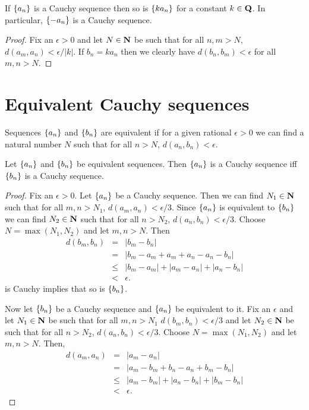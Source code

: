 \begin{lem}\label{c4s1l5}
If $\{a_n\}$ is a Cauchy sequence then so is $\{ka_n\}$ for a constant
$k \in \mathbf{Q}$. In particular, $\{-a_n\}$ is a Cauchy sequence.
\end{lem}
\begin{proof}
Fix an $\epsilon > 0$ and let $N \in \mathbf{N}$ be such that for all $n, m > N$,
$d(a_m, a_n) < \epsilon/|k|$. If $b_n = ka_n$ then we clearly have $d(b_n,
b_m) < \epsilon$ for all $m, n > N$.
\end{proof}

\section{Equivalent Cauchy sequences}\label{c4s2}
\begin{defn}\label{c4s2d1}
Sequences $\{a_n\}$ and $\{b_n\}$ are equivalent if for a given
rational $\epsilon > 0$ we can find a natural number $N$ such that for
all $n > N$, $d(a_n, b_n) < \epsilon$.
\end{defn}

\begin{lem}\label{c4s2l2}
Let $\{a_n\}$ and $\{b_n\}$ be equivalent sequences. Then $\{a_n\}$ 
is a Cauchy sequence iff $\{b_n\}$ is a Cauchy sequence.
\end{lem}
\begin{proof}
Fix an $\epsilon > 0$. Let $\{a_n\}$ be a Cauchy sequence. Then we can
find $N_1 \in \mathbf{N}$ such that for all $m, n > N_1$, $d(a_m, a_n) < 
\epsilon/3$. Since $\{a_n\}$ is equivalent to $\{b_n\}$ we can find $N_2
\in \mathbf{N}$ such that for all $n > N_2$, $d(a_n, b_n) < \epsilon/3$. Choose
$N = \max(N_1, N_2)$ and let $m, n > N$. Then
\begin{eqnarray*}
d(b_m, b_n) &=& |b_m - b_n| \\
 &=& |b_m - a_m + a_m + a_n - a_n - b_n| \\
 &\le& |b_m - a_m| + |a_m - a_n| + |a_n - b_n| \\
 &<& \epsilon.
\end{eqnarray*}
is Cauchy implies that so is $\{b_n\}$.

Now let $\{b_n\}$ be a Cauchy sequence and $\{a_n\}$ be equivalent to 
it.  Fix an $\epsilon$ and let $N_1 \in \mathbf{N}$ be such that for all $m, n > 
N_1$ $d(b_m, b_n) < \epsilon/3$ and let $N_2 \in \mathbf{N}$ be such that for 
all $n > N_2$, $d(a_n, b_n) < \epsilon/3$. Choose $N = \max(N_1, N_2)$ 
and let $m, n > N$. Then,
\begin{eqnarray*}
d(a_m, a_n) &=& |a_m - a_n| \\
 &=& |a_m - b_m + b_n - a_n + b_m - b_n| \\
 &\le& |a_m - b_m| + |a_n - b_n| + |b_m - b_n| \\
 &<& \epsilon.
\end{eqnarray*}
\end{proof}

